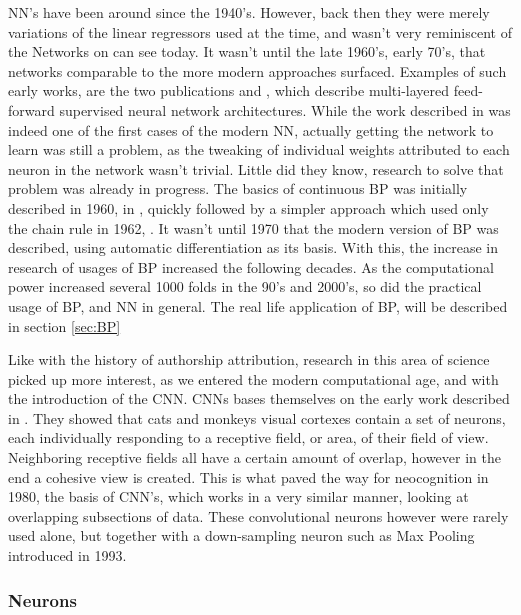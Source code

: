 \gls{NN}'s have been around since the 1940's. However, back then they were
merely variations of the linear regressors used at the time, and wasn't
very reminiscent of the Networks on can see today. It wasn't until the
late 1960's, early 70's, that networks comparable to the more modern
approaches surfaced. Examples of such early works, are the two publications
\cite{ivakhnenko1973cybernetic} and \cite{4308320}, which describe multi-layered
feed-forward supervised neural network architectures. While the work described
in \cite{4308320} was indeed one of the first cases of the modern \gls{NN},
actually getting the network to learn was still a problem, as the tweaking of
individual weights attributed to each neuron in the network wasn't trivial.
Little did they know, research to solve that problem was already in progress.
The basics of continuous \gls{BP} was initially described in 1960, in
\cite{Kelley1960}, quickly followed by a simpler approach which used only the
chain rule in 1962, \cite{DREYFUS196230}. It wasn't until 1970 that the modern
version of \gls{BP} was described, using automatic differentiation as its
basis. With this, the increase in research of usages of \gls{BP} increased the
following decades. As the computational power increased several 1000 folds in
the 90's and 2000's, so did the practical usage of \gls{BP}, and \gls{NN} in
general\cite{Schmidhuber:2015}. The real life application of \gls{BP}, will be
described in section \ref{sec:BP}

Like with the history of authorship attribution, research in this area of
science picked up more interest, as we entered the modern computational age,
and with the introduction of the \gls{CNN}. \gls{CNN}s bases themselves on
the early work described in \cite{TJP:TJP19681951215}. They showed that cats
and monkeys visual cortexes contain a set of neurons, each individually
responding to a receptive field, or area, of their field of view. Neighboring
receptive fields all have a certain amount of overlap, however in the end
a cohesive view is created. This is what paved the way for neocognition in
1980\cite{Fukushima1980}, the basis of \gls{CNN}'s, which works in a very
similar manner, looking at overlapping subsections of data. These convolutional
neurons however were rarely used alone, but together with a down-sampling neuron
such as Max Pooling introduced in 1993.\cite{Schmidhuber:2015}

\subsubsection{Neurons}\label{sec:neurons}

